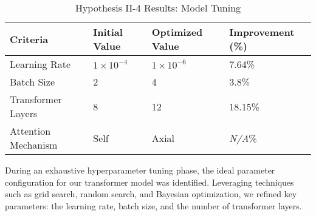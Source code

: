 \begin{table}[htbp]
    \centering
    \caption{Hypothesis II-4 Results: Model Tuning}
    \label{tab:ch5:hypo8results}
    \begin{tabular}{|l|l|l|l|}
        \hline
        \textbf{Criteria} & \textbf{Initial Value} & \textbf{Optimized Value} & \textbf{Improvement (\%)} \\\hline
        Learning Rate & \(1 \times 10^{-4}\) & \(1 \times 10^{-6}\) & 7.64\% \\\hline
        Batch Size & 2 & 4 & 3.8\% \\\hline
        Transformer Layers & 8 & 12 & 18.15\% \\\hline
        Attention Mechanism & Self & Axial & \textit{N/A}\% \\\hline
    \end{tabular}
\end{table}


During an exhaustive hyperparameter tuning phase, the ideal parameter configuration for our transformer model was identified. Leveraging techniques such as grid search, random search, and Bayesian optimization, we refined key parameters: the learning rate, batch size, and the number of transformer layers.

